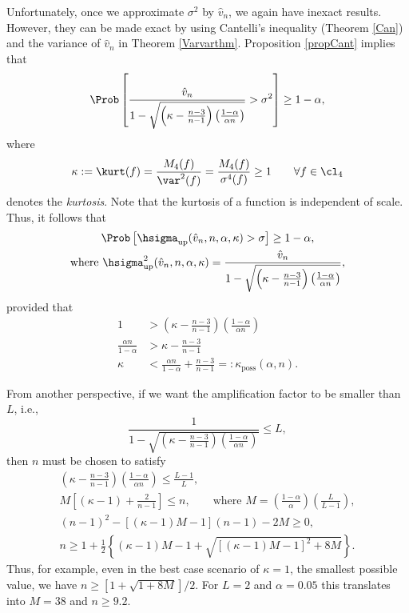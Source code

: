 \documentclass[12pt]{amsart}
\newcommand{\hv}{\hat{v}}
\begin{document}
Unfortunately, once we approximate $\sigma^2$ by $\hv_n$, we again have inexact results.  However, they can be made exact by using Cantelli's inequality (Theorem \ref{Can}) and the variance of $\hv_n$ in Theorem \ref{Varvarthm}.  Proposition \ref{propCant} implies that
\[
\Prob\left[\frac{\hv_n}{1 - \sqrt{\left ( \kappa  - \frac{n-3}{n-1}\right)\left(\frac{1-\alpha}{\alpha n}\right)}} > \sigma^2 \right] \ge 1 - \alpha,
\]
where
\begin{equation} \label{kurtdef}
\kappa:= \kurt(f) = \frac{M_4(f)}{\var^2(f)} = \frac{M_4(f)}{\sigma^4(f)} \ge 1 \qquad \forall f \in \cl_4
\end{equation}
denotes the \emph{kurtosis}.  Note that the kurtosis of a function is independent of scale.  Thus, it follows that
\begin{subequations}\label{probvarupbd}
\begin{gather}
\Prob\left[\hsigma_{\text{up}}(\hv_n,n,\alpha,\kappa)  > \sigma \right] \ge 1 - \alpha, \\
\text{where } \hsigma^2_{\text{up}}(\hv_n,n,\alpha,\kappa) = \frac{\hv_{n}}{1 - \sqrt{ \left ( \kappa  - \frac{n-3}{n-1}\right)\left(\frac{1-\alpha}{\alpha n }\right)}},
\end{gather}
\end{subequations}
provided that
\begin{align*}
1 &> \left ( \kappa  - \frac{n-3}{n-1}\right)\left(\frac{1-\alpha}{ \alpha n}\right)\\
\frac{\alpha n }{1-\alpha} & > \kappa  - \frac{n-3}{n-1} \\
\kappa & < \frac{\alpha n}{1-\alpha} + \frac{n-3}{n-1} =: \kappa_{\text{poss}} (\alpha,n).
\end{align*}

From another perspective, if we want the amplification factor to be smaller than $L$, i.e.,
\[
\frac{1}{1 - \sqrt{ \left ( \kappa  - \frac{n-3}{n-1}\right)\left(\frac{1-\alpha}{\alpha n }\right)}} \le L,
\]
then $n$ must be chosen to satisfy
\begin{gather*}
\left(\kappa  - \frac{n-3}{n-1}\right)\left(\frac{1-\alpha}{\alpha n }\right) \le \frac{L-1}{L}, \\
M\left[(\kappa-1)  + \frac{2}{n-1}\right] \le n, \qquad \text{where } M= \left(\frac{1-\alpha}{\alpha}\right)  \left(\frac{L}{L-1} \right), \\
(n-1)^2 - [(\kappa-1)M -1](n-1)  - 2 M \ge 0, \\
n \ge 1 + \frac{1}{2} \left\{ (\kappa-1)M -1 + \sqrt{\left[(\kappa-1)M -1\right]^2 + 8 M}\right\}.
\end{gather*}
Thus, for example, even in the best case scenario of $\kappa=1$, the smallest possible value, we have $n \ge [1 + \sqrt{1 + 8 M}]/2$.  For $L=2$ and $\alpha=0.05$ this translates into $M=38$ and $n \ge 9.2$.
\end{document}
